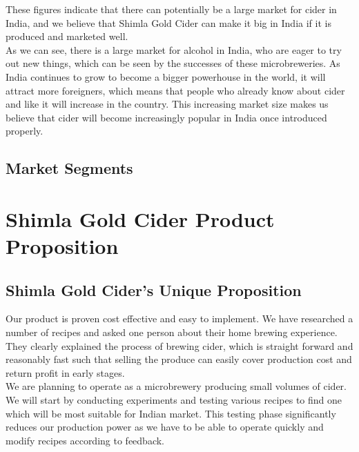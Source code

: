 \documentclass[11pt]{article}
\begin{document}
\noindent These figures indicate that there can potentially be a large market for cider in India, and we believe that Shimla Gold Cider can make it big in India if it is produced and marketed well. \\

\noindent As we can see, there is a large market for alcohol in India, who are eager to try out new things, which can be seen by the successes of these microbreweries. As India continues to grow to become a bigger powerhouse in the world, it will attract more foreigners, which means that people who already know about cider and like it will increase in the country. This increasing market size makes us believe that cider will become increasingly popular in India once introduced properly.

  \subsection{Market Segments}

\newpage
\section{Shimla Gold Cider Product Proposition}
  \subsection{Shimla Gold Cider's Unique Proposition}
Our product is proven cost effective and easy to implement. We have researched a number of recipes and asked one person about their home brewing experience. They clearly explained the process of brewing cider, which is straight forward and reasonably fast such that selling the produce can easily cover production cost and return profit in early stages. \\

\noindent We are planning to operate as a microbrewery producing small volumes of cider. We will start by conducting experiments and testing various recipes to find one which will be most suitable for Indian market. This testing phase significantly reduces our production power as we have to be able to operate quickly and modify recipes according to feedback. \\
\end{document}
